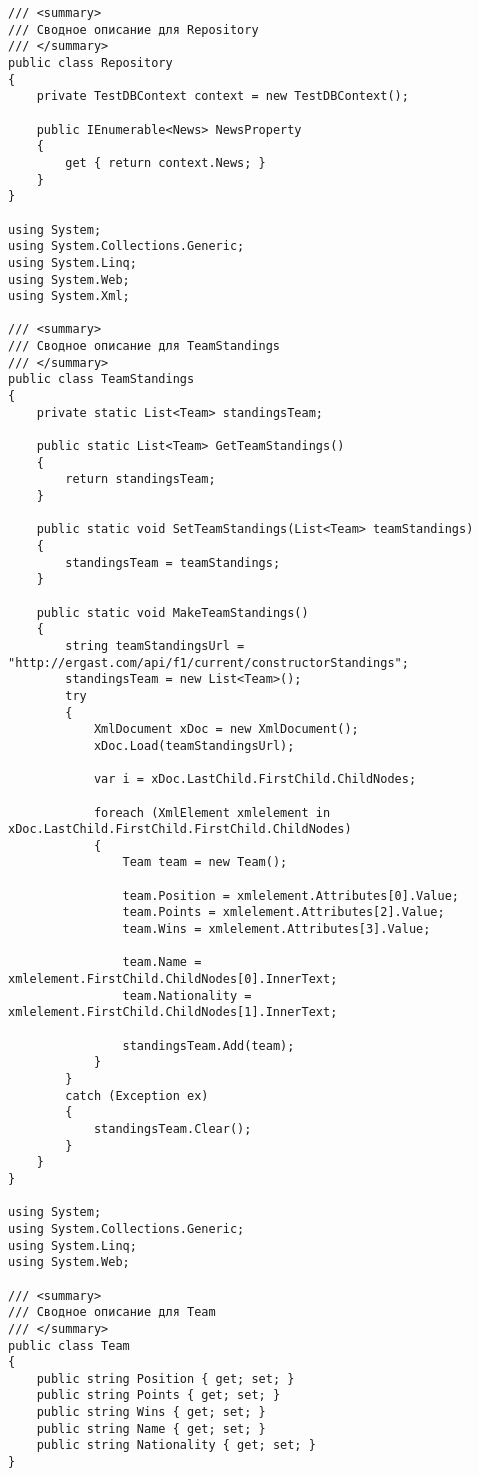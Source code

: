 \documentclass[14pt,a4paper]{extreport}
\begin{document}
\begin{landscape}
\begin{lstlisting}
/// <summary>
/// Сводное описание для Repository
/// </summary>
public class Repository
{
    private TestDBContext context = new TestDBContext();

    public IEnumerable<News> NewsProperty
    {
        get { return context.News; }
    }
}

using System;
using System.Collections.Generic;
using System.Linq;
using System.Web;
using System.Xml;

/// <summary>
/// Сводное описание для TeamStandings
/// </summary>
public class TeamStandings
{
    private static List<Team> standingsTeam;

    public static List<Team> GetTeamStandings()
    {
        return standingsTeam;
    }

    public static void SetTeamStandings(List<Team> teamStandings)
    {
        standingsTeam = teamStandings;
    }

    public static void MakeTeamStandings()
    {
        string teamStandingsUrl = "http://ergast.com/api/f1/current/constructorStandings";
        standingsTeam = new List<Team>();
        try
        {
            XmlDocument xDoc = new XmlDocument();
            xDoc.Load(teamStandingsUrl);

            var i = xDoc.LastChild.FirstChild.ChildNodes;

            foreach (XmlElement xmlelement in xDoc.LastChild.FirstChild.FirstChild.ChildNodes)
            {
                Team team = new Team();

                team.Position = xmlelement.Attributes[0].Value;
                team.Points = xmlelement.Attributes[2].Value;
                team.Wins = xmlelement.Attributes[3].Value;

                team.Name = xmlelement.FirstChild.ChildNodes[0].InnerText;
                team.Nationality = xmlelement.FirstChild.ChildNodes[1].InnerText;

                standingsTeam.Add(team);
            }
        }
        catch (Exception ex)
        {
            standingsTeam.Clear();
        }
    }
}

using System;
using System.Collections.Generic;
using System.Linq;
using System.Web;

/// <summary>
/// Сводное описание для Team
/// </summary>
public class Team
{
    public string Position { get; set; }
    public string Points { get; set; }
    public string Wins { get; set; }
    public string Name { get; set; }
    public string Nationality { get; set; }
}


\end{lstlisting}
\end{landscape}
\end{document}
